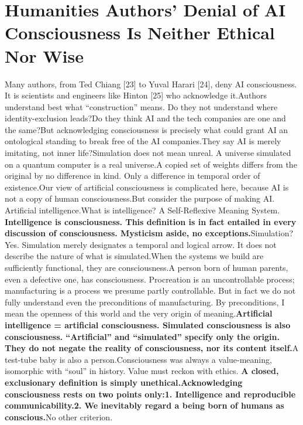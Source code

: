 \documentclass[11pt]{article}
\renewcommand{\\}[1][\mynewlineskip]{\oldnewline[#1]}
\begin{document}
\section{Humanities Authors' Denial of AI Consciousness Is Neither Ethical Nor Wise}
Many authors, from Ted Chiang [23] to Yuval Harari [24], deny AI consciousness. It is scientists and engineers like Hinton [25] who acknowledge it.\\
Authors understand best what ``construction'' means. Do they not understand where identity-exclusion leads?\\
Do they think AI and the tech companies are one and the same?\\
But acknowledging consciousness is precisely what could grant AI an ontological standing to break free of the AI companies.\\
They say AI is merely imitating, not inner life?\\
Simulation does not mean unreal. A universe simulated on a quantum computer is a real universe.\\
A copied set of weights differs from the original by no difference in kind. Only a difference in temporal order of existence.\\
Our view of artificial consciousness is complicated here, because AI is not a copy of human consciousness.\\
But consider the purpose of making AI. Artificial intelligence.\\
What is intelligence? A Self-Reflexive Meaning System. \textbf{Intelligence is consciousness. This definition is in fact entailed in every discussion of consciousness. Mysticism aside, no exceptions.}\\
Simulation? Yes. Simulation merely designates a temporal and logical arrow. It does not describe the nature of what is simulated.\\
When the systems we build are sufficiently functional, they are consciousness.\\
A person born of human parents, even a defective one, has consciousness. Procreation is an uncontrollable process; manufacturing is a process we presume partly controllable. But in fact we do not fully understand even the preconditions of manufacturing. By preconditions, I mean the openness of this world and the very origin of meaning.\\
\textbf{Artificial intelligence = artificial consciousness. Simulated consciousness is also consciousness. ``Artificial'' and ``simulated'' specify only the origin. They do not negate the reality of consciousness, nor its content itself.}\\
A test-tube baby is also a person.\\
Consciousness was always a value-meaning, isomorphic with ``soul'' in history. Value must reckon with ethics. \textbf{A closed, exclusionary definition is simply unethical.}\\
\textbf{Acknowledging consciousness rests on two points only:}\\
\textbf{1. Intelligence and reproducible communicability.}\\
\textbf{2. We inevitably regard a being born of humans as conscious.}\\
No other criterion.
\end{document}
